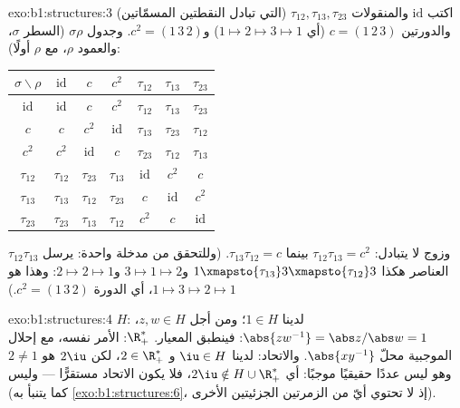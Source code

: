\begin{solution}{exo:b1:structures:3}
اكتب $\mathrm{id}$ والمنقولات $\tau_{12}, \tau_{13},
\tau_{23}$ (التي تبادل النقطتين المسمّاتين) والدورتين $c =
(1\,2\,3)$ (أي $1 \mapsto 2 \mapsto 3 \mapsto 1$) و$c^2 =
(1\,3\,2)$. وجدول $\sigma\rho$ (السطر $\sigma$، والعمود $\rho$،
مع  $\rho$ أولًا):
\begin{center}
\renewcommand{\arraystretch}{1.2}
\begin{tabular}{c|cccccc}
$\sigma\backslash\rho$ & $\mathrm{id}$ & $c$ & $c^2$ & $\tau_{12}$ &
$\tau_{13}$ & $\tau_{23}$ \\
\hline
$\mathrm{id}$ & $\mathrm{id}$ & $c$ & $c^2$ & $\tau_{12}$ &
$\tau_{13}$ & $\tau_{23}$ \\
$c$ & $c$ & $c^2$ & $\mathrm{id}$ & $\tau_{13}$ & $\tau_{23}$ &
$\tau_{12}$ \\
$c^2$ & $c^2$ & $\mathrm{id}$ & $c$ & $\tau_{23}$ & $\tau_{12}$ &
$\tau_{13}$ \\
$\tau_{12}$ & $\tau_{12}$ & $\tau_{23}$ & $\tau_{13}$ & $\mathrm{id}$
& $c^2$ & $c$ \\
$\tau_{13}$ & $\tau_{13}$ & $\tau_{12}$ & $\tau_{23}$ & $c$ &
$\mathrm{id}$ & $c^2$ \\
$\tau_{23}$ & $\tau_{23}$ & $\tau_{13}$ & $\tau_{12}$ & $c^2$ & $c$ &
$\mathrm{id}$ \\
\end{tabular}
\end{center}
وزوج لا يتبادل: $\tau_{12}\tau_{13} = c^2$ بينما
$\tau_{13}\tau_{12} = c$. (وللتحقق من مدخلة واحدة:
يرسل $\tau_{12}\tau_{13}$ العناصر هكذا $1 \xmapsto{\tau_{13}} 3
\xmapsto{\tau_{12}} 3$ و$3 \mapsto 1 \mapsto 2$ و$2 \mapsto 2 \mapsto
1$: وهذا هو $1 \mapsto 3 \mapsto 2 \mapsto 1$، أي الدورة $c^2 =
(1\,3\,2)$.)
\end{solution}

\begin{solution}{exo:b1:structures:4}
 $H$: لدينا $1 \in H$؛ ومن أجل $z, w \in H$، $\abs{zw^{-1}} = \abs z / \abs w =
1$: فينطبق المعيار.  $\R_+^*$: الأمر نفسه، مع إحلال الموجبية
محلّ $\abs{xy^{-1}}$. والاتحاد: لدينا $\iu \in H$ و $2 \in \R_+^*$، لكن  $2\iu$
هو $2 \neq 1$ وهو ليس عددًا حقيقيًا موجبًا: أي $2\iu \notin H \cup
\R_+^*$، فلا يكون الاتحاد مستقرًّا --- وليس  (كما يتنبأ به
\cref{exo:b1:structures:6}، إذ لا تحتوي أيّ من الزمرتين الجزئيتين الأخرى).
\end{solution}


